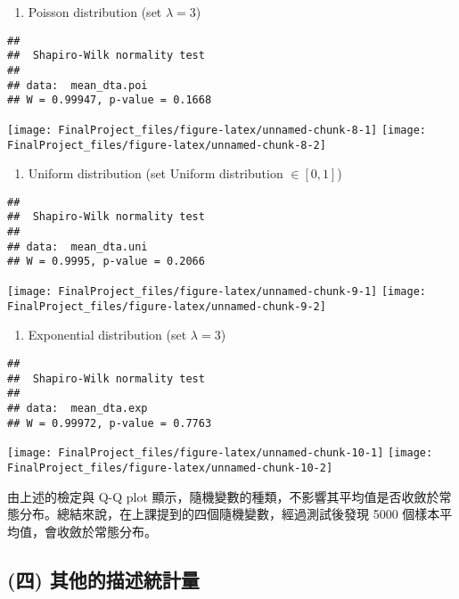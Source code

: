 \documentclass[]{article}
\providecommand{\tightlist}{%
  \setlength{\itemsep}{0pt}\setlength{\parskip}{0pt}}
\begin{document}
\begin{enumerate}
\def\labelenumi{\arabic{enumi}.}
\setcounter{enumi}{1}
\tightlist
\item
  Poisson distribution (set \(\lambda = 3\))
\end{enumerate}

\begin{verbatim}
## 
##  Shapiro-Wilk normality test
## 
## data:  mean_dta.poi
## W = 0.99947, p-value = 0.1668
\end{verbatim}

\texttt{[image: FinalProject\_files/figure-latex/unnamed-chunk-8-1]}
\texttt{[image: FinalProject\_files/figure-latex/unnamed-chunk-8-2]}

\begin{enumerate}
\def\labelenumi{\arabic{enumi}.}
\setcounter{enumi}{2}
\tightlist
\item
  Uniform distribution (set Uniform distribution \(\in [0,1]\))
\end{enumerate}

\begin{verbatim}
## 
##  Shapiro-Wilk normality test
## 
## data:  mean_dta.uni
## W = 0.9995, p-value = 0.2066
\end{verbatim}

\texttt{[image: FinalProject\_files/figure-latex/unnamed-chunk-9-1]}
\texttt{[image: FinalProject\_files/figure-latex/unnamed-chunk-9-2]}

\begin{enumerate}
\def\labelenumi{\arabic{enumi}.}
\setcounter{enumi}{3}
\tightlist
\item
  Exponential distribution (set \(\lambda = 3\))
\end{enumerate}

\begin{verbatim}
## 
##  Shapiro-Wilk normality test
## 
## data:  mean_dta.exp
## W = 0.99972, p-value = 0.7763
\end{verbatim}

\texttt{[image: FinalProject\_files/figure-latex/unnamed-chunk-10-1]}
\texttt{[image: FinalProject\_files/figure-latex/unnamed-chunk-10-2]}

由上述的檢定與 Q-Q plot
顯示，隨機變數的種類，不影響其平均值是否收斂於常態分布。總結來說，在上課提到的四個隨機變數，經過測試後發現
5000 個樣本平均值，會收斂於常態分布。

\hypertarget{-}{%
\subsection{(四) 其他的描述統計量}\label{-}}
\end{document}
